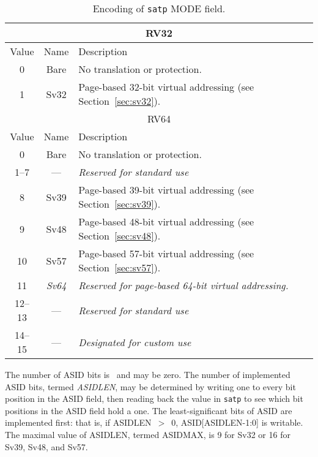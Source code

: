 \begin{table}[h]
\begin{center}
\begin{tabular}{|c|c|l|}
\hline
\multicolumn{3}{|c|}{RV32} \\
\hline
Value  & Name & Description \\
\hline
0       & Bare  & No translation or protection. \\
1       & Sv32  & Page-based 32-bit virtual addressing (see Section~\ref{sec:sv32}). \\
\hline \hline
\multicolumn{3}{|c|}{RV64} \\
\hline
Value  & Name & Description \\
\hline  
0       & Bare  & No translation or protection. \\
1--7    & ---   & {\em Reserved for standard use} \\
8       & Sv39  & Page-based 39-bit virtual addressing (see Section~\ref{sec:sv39}). \\
9       & Sv48  & Page-based 48-bit virtual addressing (see Section~\ref{sec:sv48}). \\
10      & Sv57  & Page-based 57-bit virtual addressing (see Section~\ref{sec:sv57}). \\
11      & {\em Sv64} & {\em Reserved for page-based 64-bit virtual addressing.} \\
12--13  & ---   & {\em Reserved for standard use} \\
14--15  & ---   & {\em Designated for custom use} \\
\hline
\end{tabular}
\end{center}
\caption{Encoding of {\tt satp} MODE field.}
\label{tab:satp-mode}
\end{table}

The number of ASID bits is \unspecified\ and may be zero.  The
number of implemented ASID bits, termed {\mbox {\em ASIDLEN}}, may be
determined by writing one to every bit position in the ASID field, then
reading back the value in {\tt satp} to see which bit positions in the ASID
field hold a one.  The least-significant bits of ASID are implemented first:
that is, if ASIDLEN~$>$~0, ASID[ASIDLEN-1:0] is writable.  The maximal value
of ASIDLEN, termed ASIDMAX, is 9 for Sv32 or 16 for Sv39, Sv48, and Sv57.

